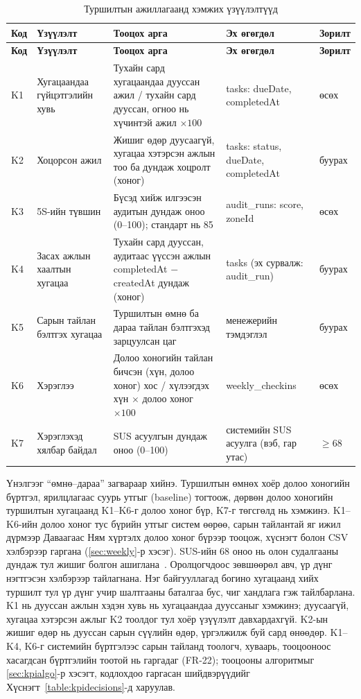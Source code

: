 \begin{longtable}{|p{1.0cm}|p{3.4cm}|p{4.8cm}|p{3.4cm}|p{1.6cm}|}
\caption{Туршилтын ажиллагаанд хэмжих үзүүлэлтүүд}\label{table:kpi}\\ \hline
\textbf{Код} & \textbf{Үзүүлэлт} & \textbf{Тооцох арга} & \textbf{Эх өгөгдөл} & \textbf{Зорилт} \\ \hline
\endfirsthead
\hline
\textbf{Код} & \textbf{Үзүүлэлт} & \textbf{Тооцох арга} & \textbf{Эх өгөгдөл} & \textbf{Зорилт} \\ \hline
\endhead
K1 & Хугацаандаа гүйцэтгэлийн хувь & Тухайн сард хугацаандаа дууссан ажил / тухайн сард дууссан, огноо нь хүчинтэй ажил $\times 100$ & tasks: dueDate, completedAt & өсөх \\ \hline
K2 & Хоцорсон ажил & Жишиг өдөр дуусаагүй, хугацаа хэтэрсэн ажлын тоо ба дундаж хоцролт (хоног) & tasks: status, dueDate, completedAt & буурах \\ \hline
K3 & 5S-ийн түвшин & Бүсэд хийж илгээсэн аудитын дундаж оноо (0--100); стандарт нь 85 & audit\_runs: score, zoneId & өсөх \\ \hline
K4 & Засах ажлын хаалтын хугацаа & Тухайн сард дууссан, аудитаас үүссэн ажлын completedAt $-$ createdAt дундаж (хоног) & tasks (эх сурвалж: audit\_run) & буурах \\ \hline
K5 & Сарын тайлан бэлтгэх хугацаа & Туршилтын өмнө ба дараа тайлан бэлтгэхэд зарцуулсан цаг & менежерийн тэмдэглэл & буурах \\ \hline
K6 & Хэрэглээ & Долоо хоногийн тайлан бичсэн (хүн, долоо хоног) хос / хүлээгдэх хүн $\times$ долоо хоног $\times 100$ & weekly\_checkins & өсөх \\ \hline
K7 & Хэрэглэхэд хялбар байдал & SUS асуулгын дундаж оноо (0--100) & системийн SUS асуулга (вэб, гар утас) & $\geq 68$ \\ \hline
\end{longtable}

Үнэлгээг ``өмнө--дараа'' загвараар хийнэ. Туршилтын өмнөх хоёр долоо хоногийн бүртгэл, ярилцлагаас суурь утгыг (baseline) тогтоож, дөрвөн долоо хоногийн туршилтын хугацаанд K1--K6-г долоо хоног бүр, K7-г төгсгөлд нь хэмжинэ. K1--K6-ийн долоо хоног тус бүрийн утгыг систем өөрөө, сарын тайлантай яг ижил дүрмээр Даваагаас Ням хүртэлх долоо хоног бүрээр тооцож, хүснэгт болон CSV хэлбэрээр гаргана (\ref{sec:weekly}-р хэсэг). SUS-ийн 68 оноо нь олон судалгааны дундаж тул жишиг болгон ашиглана~\cite{brooke,bangor}. Оролцогчдоос зөвшөөрөл авч, үр дүнг нэгтгэсэн хэлбэрээр тайлагнана. Нэг байгууллагад богино хугацаанд хийх туршилт тул үр дүнг учир шалтгааны баталгаа бус, чиг хандлага гэж тайлбарлана. K1 нь дууссан ажлын хэдэн хувь нь хугацаандаа дууссаныг хэмжинэ; дуусаагүй, хугацаа хэтэрсэн ажлыг K2 тоолдог тул хоёр үзүүлэлт давхардахгүй. K2-ын жишиг өдөр нь дууссан сарын сүүлийн өдөр, үргэлжилж буй сард өнөөдөр. K1--K4, K6-г системийн бүртгэлээс сарын тайланд тоологч, хуваарь, тооцооноос хасагдсан бүртгэлийн тоотой нь гаргадаг (FR-22); тооцооны алгоритмыг \ref{sec:kpialgo}-р хэсэгт, кодлохдоо гаргасан шийдвэрүүдийг Хүснэгт~\ref{table:kpidecisions}-д харуулав.

